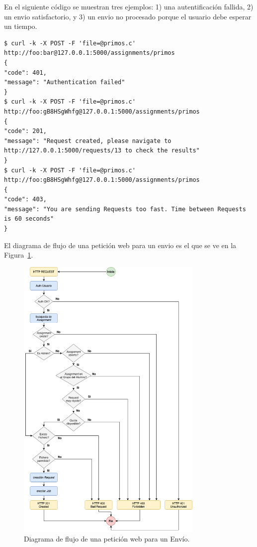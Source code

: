 \documentclass[11pt,spanish,listoffigures,listoftables]{tfgetsinf}
\begin{document}
En el siguiente código se muestran tres ejemplos: 1) una autentificación fallida, 2) un \gls{envio} satisfactorio, y 3) un \Gls{envio} no procesado porque el usuario debe esperar un tiempo. \newline

\begin{lstlisting}[style=ascii-tree]
$ curl -k -X POST -F 'file=@primos.c' http://foo:bar@127.0.0.1:5000/assignments/primos
{
"code": 401,
"message": "Authentication failed"
}
$ curl -k -X POST -F 'file=@primos.c' http://foo:gB8HSgWhfg@127.0.0.1:5000/assignments/primos
{
"code": 201,
"message": "Request created, please navigate to http://127.0.0.1:5000/requests/13 to check the results"
}
$ curl -k -X POST -F 'file=@primos.c' http://foo:gB8HSgWhfg@127.0.0.1:5000/assignments/primos
{
"code": 403,
"message": "You are sending Requests too fast. Time between Requests is 60 seconds"
}
\end{lstlisting}

El diagrama de flujo de una petición web para un \gls{envio} es el que se ve en la Figura~\ref{figura:request-flowchart}.

\begin{figure}[!t]
	\centering
	\includegraphics[width=0.8\textwidth]{img/request-flowchart}
    \caption[Diagrama de flujo de una petición web para un Envío]{Diagrama de flujo de una petición web para un Envío.}
	\label{figura:request-flowchart}
\end{figure}
\end{document}
